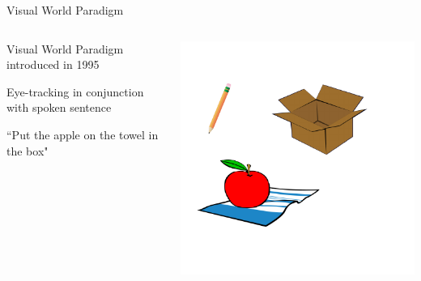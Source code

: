 \documentclass{beamer}
\newcommand{\vp}{\vspace{2mm}}
\begin{document}
\begin{frame}{Visual World Paradigm}
\begin{columns}
\begin{column}{0.45\textwidth}

Visual World Paradigm introduced in 1995 \vp

Eye-tracking in conjunction with spoken sentence \vp

``Put the apple on the towel in the box" 



\end{column}
\begin{column}{0.5\textwidth}  %
\begin{center}
\includegraphics[scale=.9]{img/towel_apple_box.pdf}
\end{center}
\end{column}
\end{columns}
\end{frame}

\end{document}
